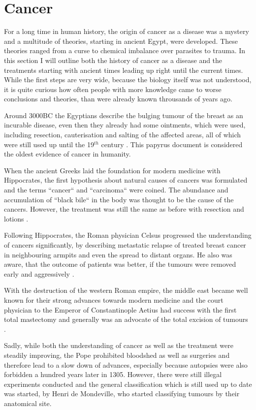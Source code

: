 \section{Cancer}
\label{intro-sec:cancer}

For a long time in human history, the origin of cancer as a disease was a mystery and a multitude of theories, starting in ancient Egypt, were developed. These theories ranged from a curse to chemical imbalance over parasites to trauma. In this section I will outline both the history of cancer as a disease and the treatments starting with ancient times leading up right until the current times. While the first steps are very wide, because the biology itself was not understood, it is quite curious how often people with more knowledge came to worse conclusions and theories, than were already known throusands of years ago.

Around 3000BC the Egyptians describe the bulging tumour of the breast as an incurable disease\cite{Breasted1930}, even then they already had some ointments, which were used, including resection, cauterisation and salting of the affected areas, all of which were still used up until the 19$^{th}$ century \cite{Hajdu2004}. This papyrus document is considered the oldest evidence of cancer in humanity.

When the ancient Greeks laid the foundation for modern medicine with Hippocrates, the first hypothesis about natural causes of cancers was formulated and the terms ``cancer`` and ``carcinoma`` were coined. The abundance and accumulation of ``black bile`` in the body was thought to be the cause of the cancers. However, the treatment was still the same as before with resection and lotions \cite{Chadwick1950}.

Following Hippocrates, the Roman physician Celsus progressed the understanding of cancers significantly, by describing metastatic relapse of treated breast cancer in neighbouring armpits and even the spread to distant organs. He also was aware, that the outcome of patients was better, if the tumours were removed early and aggressively \cite{Celsus1939}.

With the destruction of the western Roman empire, the middle east became well known for their strong advances towards modern medicine and the court physician to the Emperor of Constantinople Aetius had success with the first total mastectomy and generally was an advocate of the total excision of tumours \cite{Browne2012}. 

Sadly, while both the understanding of cancer as well as the treatment were steadily improving, the Pope prohibited bloodshed as well as surgeries and therefore lead to a slow down of advances, especially because autopsies were also forbidden a hundred years later in 1305. However, there were still illegal experiments conducted and the general classification which is still used up to date was started, by Henri de Mondeville, who started classifying tumours by their anatomical site\cite{Pilcher1895}.

